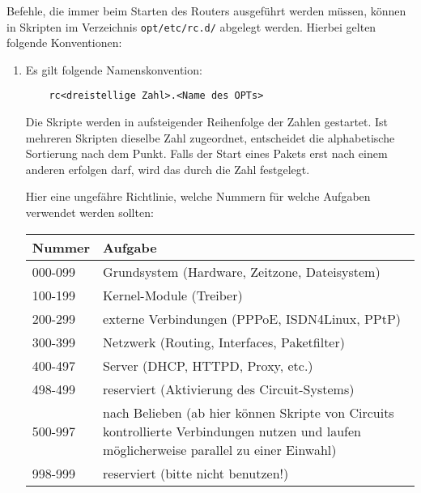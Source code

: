Befehle, die immer beim Starten des Routers ausgeführt werden müssen,
können in Skripten im Verzeichnis \texttt{opt/etc/rc.d/} abgelegt werden. Hierbei
gelten folgende Konventionen:

\begin{enumerate}
  \item Es gilt folgende Namenskonvention:

\begin{example}
\begin{verbatim}
    rc<dreistellige Zahl>.<Name des OPTs>
\end{verbatim}
\end{example}
      
    Die Skripte werden in aufsteigender Reihenfolge der Zahlen
    gestartet. Ist mehreren Skripten dieselbe Zahl zugeordnet,
    entscheidet die alphabetische Sortierung nach dem Punkt. Falls
    der Start eines Pakets erst nach einem anderen erfolgen darf,
    wird das durch die Zahl festgelegt.

    Hier eine ungefähre Richtlinie, welche Nummern für welche Aufgaben
    verwendet werden sollten:

    \begin{table}[htbp]
    \centering
    \begin{tabular}{lp{}}
            \hline
            Nummer        &       Aufgabe         \\
            \hline
            \hline
            000-099       &       Grundsystem (Hardware, Zeitzone, Dateisystem) \\
            100-199       &       Kernel-Module (Treiber) \\
            200-299       &       externe Verbindungen (PPPoE, ISDN4Linux, PPtP) \\
            300-399       &       Netzwerk (Routing, Interfaces, Paketfilter) \\
            400-497       &       Server (DHCP, HTTPD, Proxy, etc.) \\
            498-499       &       reserviert (Aktivierung des Circuit-Systems) \\
            500-997       &       nach Belieben (ab hier können Skripte von Circuits
                                  kontrollierte Verbindungen nutzen und laufen
                                  möglicherweise parallel zu einer Einwahl) \\
            998-999       &       reserviert (bitte nicht benutzen!) \\
            \hline
    \end{tabular}
    \end{table}


\end{enumerate}
